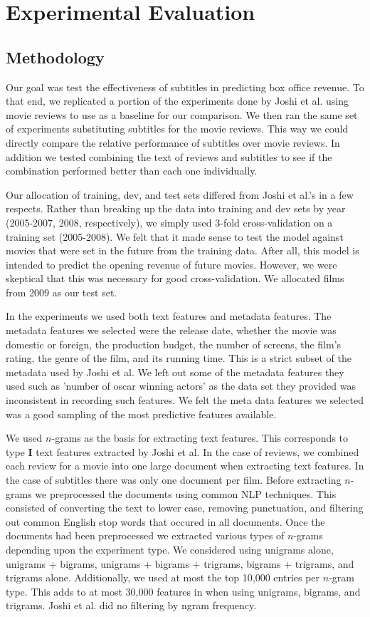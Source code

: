 \documentclass[11pt]{article}
\begin{document}
\section{Experimental Evaluation}
\subsection{Methodology}
Our goal was test the effectiveness of subtitles in predicting box office revenue.
To that end, we replicated a portion of the experiments done by Joshi et al. using
movie reviews to use as a baseline for our comparison. We then ran the same set of
experiments substituting subtitles for the movie reviews. This way we could directly
compare the relative performance of subtitles over movie reviews. In addition we
tested combining the text of reviews and subtitles to see if the combination performed
better than each one individually.

Our allocation of training, dev, and test sets differed from Joshi et al.'s in a few
respects. Rather than breaking up the data into training and dev sets by year
(2005-2007, 2008, respectively), we simply used 3-fold cross-validation on a training
set (2005-2008). We felt that it made sense to test the model against movies that were
set in the future from the training data. After all, this model is intended to predict
the opening revenue of future movies. However, we were skeptical that this was necessary
for good cross-validation. We allocated films from 2009 as our test set.

In the experiments we used both text features and metadata features. The metadata features
we selected were the release date, whether the movie was domestic or foreign, the production
budget, the number of screens, the film's rating, the genre of the film, and its running
time. This is a strict subset of the metadata used by Joshi et al. We left out some of the
metadata features they used such as 'number of oscar winning actors' as the data set they
provided was inconsistent in recording such features. We felt the meta data features we
selected was a good sampling of the most predictive features available.

We used $n$-grams as the basis for extracting text features. This corresponds to type
\textbf{I} text features extracted by Joshi et al. In the case of reviews, we combined
each review for a movie into one large document when extracting text features. In the
case of subtitles there was only one document per film. Before extracting $n$-grams we
preprocessed the documents using common NLP techniques. This consisted of converting
the text to lower case, removing punctuation, and filtering out common English stop words that occured in all documents. Once the documents had been preprocessed we extracted various types of $n$-grams depending upon the experiment type. We considered using unigrams alone,
unigrams + bigrams, unigrams + bigrams + trigrams, bigrams + trigrams, and trigrams alone.
Additionally, we used at most the top 10,000 entries per $n$-gram type. This adds to at most
30,000 features in when using unigrams, bigrams, and trigrams. Joshi et al. did no filtering
by ngram frequency.
\end{document}
